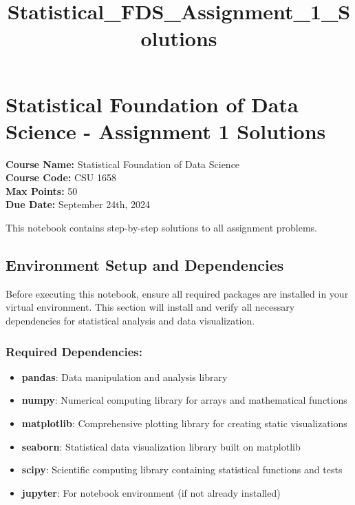 \documentclass[11pt]{article}
\title{Statistical\_FDS\_Assignment\_1\_Solutions}
\providecommand{\tightlist}{%
      \setlength{\itemsep}{0pt}\setlength{\parskip}{0pt}}
\begin{document}
    
    \maketitle
    
    

    
    \section{Statistical Foundation of Data Science - Assignment 1
Solutions}\label{statistical-foundation-of-data-science---assignment-1-solutions}

\textbf{Course Name:} Statistical Foundation of Data Science\\
\textbf{Course Code:} CSU 1658\\
\textbf{Max Points:} 50\\
\textbf{Due Date:} September 24th, 2024

This notebook contains step-by-step solutions to all assignment
problems.

    \subsection{Environment Setup and
Dependencies}\label{environment-setup-and-dependencies}

Before executing this notebook, ensure all required packages are
installed in your virtual environment. This section will install and
verify all necessary dependencies for statistical analysis and data
visualization.

\subsubsection{Required Dependencies:}\label{required-dependencies}

\begin{itemize}
\tightlist
\item
  \textbf{pandas}: Data manipulation and analysis library
\item
  \textbf{numpy}: Numerical computing library for arrays and
  mathematical functions
\item
  \textbf{matplotlib}: Comprehensive plotting library for creating
  static visualizations
\item
  \textbf{seaborn}: Statistical data visualization library built on
  matplotlib
\item
  \textbf{scipy}: Scientific computing library containing statistical
  functions and tests
\item
  \textbf{jupyter}: For notebook environment (if not already installed)
\end{itemize}
\end{document}
